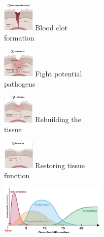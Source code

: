 \begin{minipage}
{0.24\linewidth}
    \includegraphics[width=15mm]{src/Images/stage_1.png}
    Blood clot\\ formation
\end{minipage}
\begin{minipage}
{0.24\linewidth}
    \includegraphics[width=15mm]{src/Images/stage_2.png}
    Fight potential\\ pathogens
\end{minipage}
\begin{minipage}
{0.24\linewidth}
    \includegraphics[width=15mm]{src/Images/stage_3.png}
    Rebuilding the\\ tissue
\end{minipage}
\begin{minipage}
{0.24\linewidth}
    \includegraphics[width=15mm]{src/Images/stage_4.png}
    Restoring tissue\\ function
\end{minipage}
\includegraphics[width=50mm]{src/Images/stages_timeline.png}

